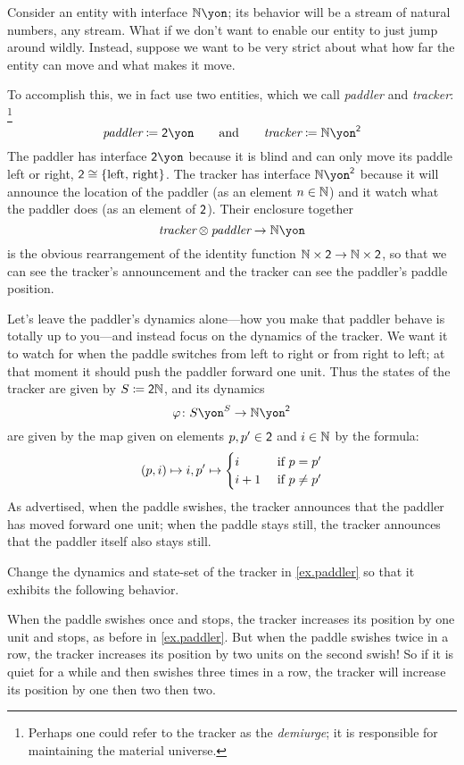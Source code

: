 \documentclass[Book-Poly]{subfiles}
\begin{document}
\begin{example}[Paddling]\label{ex.paddler}
Consider an entity with interface $\nn\yon$; its behavior will be a stream of natural numbers, any stream. What if we don't want to enable our entity to just jump around wildly. Instead, suppose we want to be very strict about what how far the entity can move and what makes it move.

To accomplish this, we in fact use two entities, which we call \emph{paddler} and \emph{tracker}:%
\footnote{Perhaps one could refer to the tracker as the \emph{demiurge}; it is responsible for maintaining the material universe.}
\[
  \textit{paddler}\coloneqq\2\yon
  \qqand
  \textit{tracker}\coloneqq\nn\yon^\2
\]
The paddler has interface $\2\yon$ because it is blind and can only move its paddle left or right, $\textsf{2}\cong\{\text{left, right}\}$. The tracker has interface $\nn\yon^\2$ because it will announce the location of the paddler (as an element $n\in\mathbb{N}$) and it watch what the paddler does (as an element of $\textsf{2}$). Their enclosure together
\[
\textit{tracker}\otimes\textit{paddler}\to\nn\yon
\]
is the obvious rearrangement of the identity function $\mathbb{N}\times\textsf{2}\to\mathbb{N}\times\textsf{2}$, so that we can see the tracker's announcement and the tracker can see the paddler's paddle position.

Let's leave the paddler's dynamics alone---how you make that paddler behave is totally up to you---and instead focus on the dynamics of the tracker. We want it to watch for when the paddle switches from left to right or from right to left; at that moment it should push the paddler forward one unit. Thus the states of the tracker are given by $S\coloneqq\textsf{2}\mathbb{N}$, and its dynamics
\[\varphi\colon S\yon^S\to\nn\yon^\2\]
are given by the map given on elements $p,p'\in\textsf{2}$ and $i\in\mathbb{N}$ by the formula:
\[
  (p,i)\mapsto i,p'\mapsto
	\begin{cases}
		i&\textnormal{ if }p=p'\\
		i+1&\textnormal{ if }p\neq p'
	\end{cases}
\]
As advertised, when the paddle swishes, the tracker announces that the paddler has moved forward one unit; when the paddle stays still, the tracker announces that the paddler itself also stays still.
\end{example}

\begin{exercise}
Change the dynamics and state-set of the tracker in \cref{ex.paddler} so that it exhibits the following behavior.

When the paddle swishes once and stops, the tracker increases its position by one unit and stops, as before in \cref{ex.paddler}. But when the paddle swishes twice in a row, the tracker increases its position by two units on the second swish! So if it is quiet for a while and then swishes three times in a row, the tracker will increase its position by one then two then two.
\end{exercise}
\end{document}
